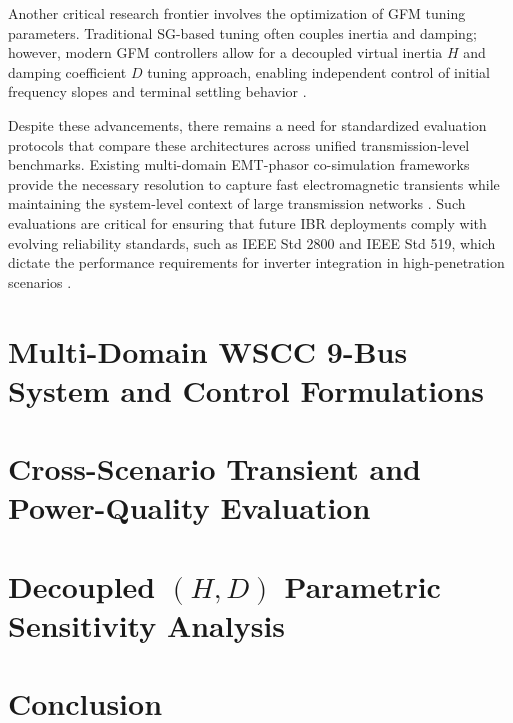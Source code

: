 \documentclass[conference]{IEEEtran}
\begin{document}
Another critical research frontier involves the optimization of GFM tuning parameters. Traditional SG-based tuning often couples inertia and damping; however, modern GFM controllers allow for a decoupled virtual inertia $H$ and damping coefficient $D$ tuning approach, enabling independent control of initial frequency slopes and terminal settling behavior \cite{Decoupled_Inertia_Damping}. 

Despite these advancements, there remains a need for standardized evaluation protocols that compare these architectures across unified transmission-level benchmarks. Existing multi-domain EMT-phasor co-simulation frameworks provide the necessary resolution to capture fast electromagnetic transients while maintaining the system-level context of large transmission networks \cite{MultiDomain_CoSim}. Such evaluations are critical for ensuring that future IBR deployments comply with evolving reliability standards, such as IEEE Std 2800 and IEEE Std 519, which dictate the performance requirements for inverter integration in high-penetration scenarios \cite{IEEE_Standards}.

\section{Multi-Domain WSCC 9-Bus System and Control Formulations}\label{sec:methodology}

\section{Cross-Scenario Transient and Power-Quality Evaluation}\label{sec:experiments}

\section{Decoupled $(H, D)$ Parametric Sensitivity Analysis}\label{sec:sensitivity}

\section{Conclusion}\label{sec:conclusion}



\end{document}
